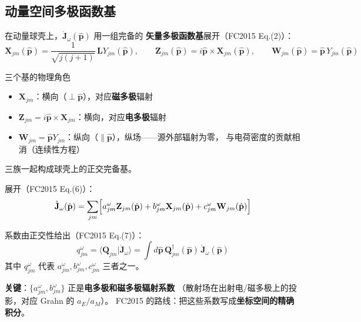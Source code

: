 \subsection{动量空间多极函数基}

在动量球壳上，$\mathring{\mathbf{J}}_\omega(\hat{\mathbf{p}})$ 用一组完备的
\textbf{矢量多极函数基}展开（FC2015 Eq.(2)）：
\begin{equation}
  \mathbf{X}_{jm}(\hat{\mathbf{p}}) = \frac{1}{\sqrt{j(j+1)}}\,\mathbf{L}Y_{jm}(\hat{\mathbf{p}}),
  \qquad
  \mathbf{Z}_{jm}(\hat{\mathbf{p}}) = i\hat{\mathbf{p}}\times\mathbf{X}_{jm}(\hat{\mathbf{p}}),
  \qquad
  \mathbf{W}_{jm}(\hat{\mathbf{p}}) = \hat{\mathbf{p}}\,Y_{jm}(\hat{\mathbf{p}})
  \label{eq:fc_basis}
\end{equation}

\begin{stepbox}{三个基的物理角色}
\begin{itemize}
  \item $\mathbf{X}_{jm}$：横向（$\perp\hat{\mathbf{p}}$），对应\textbf{磁多极}辐射
  \item $\mathbf{Z}_{jm}=i\hat{\mathbf{p}}\times\mathbf{X}_{jm}$：横向，对应\textbf{电多极}辐射
  \item $\mathbf{W}_{jm}=\hat{\mathbf{p}}Y_{jm}$：纵向（$\parallel\hat{\mathbf{p}}$），纵场——源外部辐射为零，
    与电荷密度的贡献相消（连续性方程）
\end{itemize}
三族一起构成球壳上的正交完备基。
\end{stepbox}

展开（FC2015 Eq.(6)）：
\begin{equation}
  \mathring{\mathbf{J}}_\omega(\hat{\mathbf{p}})
  = \sum_{jm}\Bigl[a^\omega_{jm}\mathbf{Z}_{jm}(\hat{\mathbf{p}})
    + b^\omega_{jm}\mathbf{X}_{jm}(\hat{\mathbf{p}})
    + c^\omega_{jm}\mathbf{W}_{jm}(\hat{\mathbf{p}})\Bigr]
  \label{eq:fc_expand}
\end{equation}

系数由正交性给出（FC2015 Eq.(7)）：
\begin{equation}
  q^\omega_{jm} = \langle\mathbf{Q}_{jm}\vert\mathring{\mathbf{J}}_\omega\rangle
  = \int d\hat{\mathbf{p}}\,\mathbf{Q}^\dagger_{jm}(\hat{\mathbf{p}})\,\mathring{\mathbf{J}}_\omega(\hat{\mathbf{p}})
  \label{eq:fc_coeff}
\end{equation}
其中 $q^\omega_{jm}$ 代表 $a^\omega_{jm},b^\omega_{jm},c^\omega_{jm}$ 三者之一。

\begin{noteworthy}
\textbf{关键}：$\{a^\omega_{jm},b^\omega_{jm}\}$ 正是\textbf{电多极和磁多极辐射系数}
（散射场在出射电/磁多极上的投影，对应 Grahn 的 $a_E/a_M$）。
FC2015 的路线：把这些系数写成\textbf{坐标空间的精确积分}。
\end{noteworthy}


